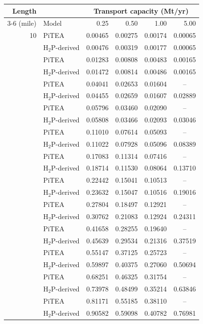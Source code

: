 \begin{tabular}{@{}rlrrrr@{}}
\toprule
Length & & \multicolumn{4}{c}{Transport capacity (Mt/yr)} \\
\cmidrule(l){3-6}
(mile) & Model & 0.25 & 0.50 & 1.00 & 5.00 \\
\midrule
10 & PiTEA & 0.00465 & 0.00275 & 0.00174 & 0.00065 \\
 & H$_2$P-derived & 0.00476 & 0.00319 & 0.00177 & 0.00065 \\
\addlinespace[2pt]
25 & PiTEA & 0.01283 & 0.00808 & 0.00483 & 0.00165 \\
 & H$_2$P-derived & 0.01472 & 0.00814 & 0.00486 & 0.00165 \\
\addlinespace[2pt]
75 & PiTEA & 0.04041 & 0.02653 & 0.01604 & \multicolumn{1}{c}{--} \\
 & H$_2$P-derived & 0.04455 & 0.02659 & 0.01607 & 0.02889 \\
\addlinespace[2pt]
100 & PiTEA & 0.05796 & 0.03460 & 0.02090 & \multicolumn{1}{c}{--} \\
 & H$_2$P-derived & 0.05808 & 0.03466 & 0.02093 & 0.03046 \\
\addlinespace[2pt]
200 & PiTEA & 0.11010 & 0.07614 & 0.05093 & \multicolumn{1}{c}{--} \\
 & H$_2$P-derived & 0.11022 & 0.07928 & 0.05096 & 0.08389 \\
\addlinespace[2pt]
300 & PiTEA & 0.17083 & 0.11314 & 0.07416 & \multicolumn{1}{c}{--} \\
 & H$_2$P-derived & 0.18714 & 0.11530 & 0.08064 & 0.13710 \\
\addlinespace[2pt]
400 & PiTEA & 0.22442 & 0.15041 & 0.10513 & \multicolumn{1}{c}{--} \\
 & H$_2$P-derived & 0.23632 & 0.15047 & 0.10516 & 0.19016 \\
\addlinespace[2pt]
500 & PiTEA & 0.27804 & 0.18497 & 0.12921 & \multicolumn{1}{c}{--} \\
 & H$_2$P-derived & 0.30762 & 0.21083 & 0.12924 & 0.24311 \\
\addlinespace[2pt]
750 & PiTEA & 0.41658 & 0.28255 & 0.19640 & \multicolumn{1}{c}{--} \\
 & H$_2$P-derived & 0.45639 & 0.29534 & 0.21316 & 0.37519 \\
\addlinespace[2pt]
1000 & PiTEA & 0.55147 & 0.37125 & 0.25723 & \multicolumn{1}{c}{--} \\
 & H$_2$P-derived & 0.59897 & 0.40375 & 0.27060 & 0.50694 \\
\addlinespace[2pt]
1250 & PiTEA & 0.68251 & 0.46325 & 0.31754 & \multicolumn{1}{c}{--} \\
 & H$_2$P-derived & 0.73978 & 0.48499 & 0.35214 & 0.63846 \\
\addlinespace[2pt]
1500 & PiTEA & 0.81171 & 0.55185 & 0.38110 & \multicolumn{1}{c}{--} \\
 & H$_2$P-derived & 0.90582 & 0.59098 & 0.40782 & 0.76981 \\
\bottomrule
\end{tabular}
